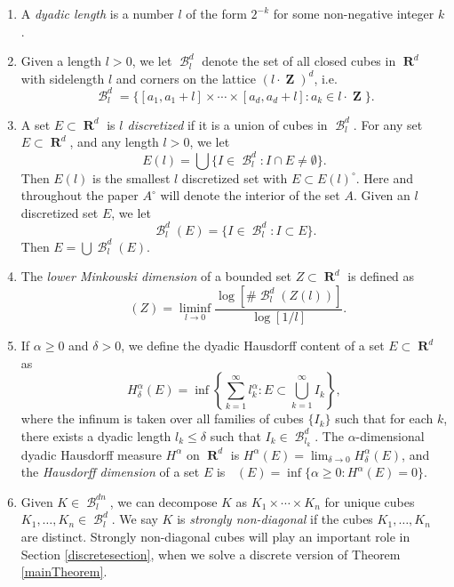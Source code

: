 \documentclass[dvipsnames,letterpaper,12pt]{article}
\numberwithin{equation}{section}
\theoremstyle{plain}
\theoremstyle{remark}
\DeclareMathOperator{\hausdim}{\dim_{\mathbf{H}}}
\DeclareMathOperator{\lowminkdim}{\underline{\dim}_{\mathbf{M}}}
\DeclareMathOperator{\RR}{\mathbf{R}}
\DeclareMathOperator{\ZZ}{\mathbf{Z}}
\DeclareMathOperator{\setcolon}{\colon}
\DeclareMathOperator{\B}{\mathcal{B}}
\begin{document}
\begin{enumerate}
	\item\label{defDyadicLength} A {\it dyadic length} is a number $l$ of the form $2^{-k}$ for some non-negative integer $k$.

	\item\label{defDyadicGrid} Given a length $l > 0$, we let $\B^d_l$ denote the set of all closed cubes in $\RR^d$ with sidelength $l$ and corners on the lattice $(l \cdot \ZZ)^d$, i.e.
	\[ \B^d_l = \{ [a_1, a_1 + l] \times \cdots \times [a_d, a_d+l] \setcolon a_k \in l \cdot \ZZ \}. \]

	\item A set $E \subset \RR^d$ is \emph{$l$ discretized} if it is a union of cubes in $\B^d_l$. For any set $E \subset \RR^d$, and any length $l > 0$, we let
	\[ E(l) = \bigcup \{ I \in \B^d_l \setcolon I \cap E \neq \emptyset \}. \]
	Then $E(l)$ is the smallest $l$ discretized set with $E \subset E(l)^\circ$. Here and throughout the paper $A^{\circ}$ will denote the interior of the set $A$. Given an $l$ discretized set $E$, we let
	\[ \B^d_l(E) = \{ I \in \B^d_l \setcolon I \subset E \}. \]
	Then $E = \bigcup \B^d_l(E)$.

	\item\label{defnMinkowskiDim} The {\it lower Minkowski dimension} of a bounded set $Z \subset \RR^d$ is defined as
	\[ \lowminkdim(Z) = \liminf_{l \to 0} \frac{\log \left[ \# \B^d_l(Z(l)) \right]}{\log[ 1/l ]}. \]

	\item\label{defHausdorffDim} If $\alpha \geq 0$ and $\delta > 0$, we define the dyadic Hausdorff content of a set $E\subset\RR^d$ as 
	\[ H^\alpha_\delta(E) = \inf \left\{ \sum_{k = 1}^\infty l_k^\alpha \setcolon E \subset \bigcup_{k = 1}^\infty I_k \right\}, \]
	where the infinum is taken over all families of cubes $\{ I_k \}$ such that for each $k$, there exists a dyadic length $l_k \leq \delta$ such that $I_k \in \B^d_{l_k}$. The $\alpha$-dimensional dyadic Hausdorff measure $H^\alpha$ on $\RR^d$ is $H^\alpha(E) = \lim_{\delta \to 0} H_\delta^\alpha(E)$, and the {\it Hausdorff dimension} of a set $E$ is $\hausdim(E) = \inf \{ \alpha \geq 0 \setcolon H^\alpha(E) = 0 \}$.

	\item\label{defStronglyNonDiagonal} Given $K \in \B^{dn}_l$, we can decompose $K$ as $K_1 \times \cdots \times K_n$ for unique cubes $K_1, \dots, K_n \in \B_l^d$. We say $K$ is {\it strongly non-diagonal} if the cubes $K_1, \dots, K_n$ are distinct. Strongly non-diagonal cubes will play an important role in Section \ref{discretesection}, when we solve a discrete version of Theorem \ref{mainTheorem}.


\end{enumerate}
\end{document}

